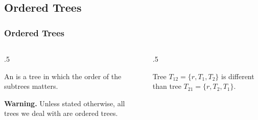 \documentclass[10pt]{beamer}
\begin{document}
\subsection{Ordered Trees}
\begin{frame}[t]\frametitle{Ordered Trees}
	\begin{columns}[T] %
	\begin{column}{.5\linewidth} %
		{\small
 		\begin{definition}
		An  is a tree in which the order of the subtrees matters.
 		\end{definition}
		} %
		
		\textbf{Warning.}
		Unless stated otherwise, all trees we deal with are ordered trees.
	\end{column} %
	\begin{column}{.5\linewidth} %
		{\small
		\begin{example}
			Tree $T_{12} = \{ r, T_{1}, T_{2} \}$ is different than
			tree $T_{21} = \{ r, T_{2}, T_{1} \}$.
			
			{\tiny 			
				
				\quad
				
				} %
			\end{example}
		} %
	\end{column} %
	\end{columns} %
\end{frame}




\end{document}
